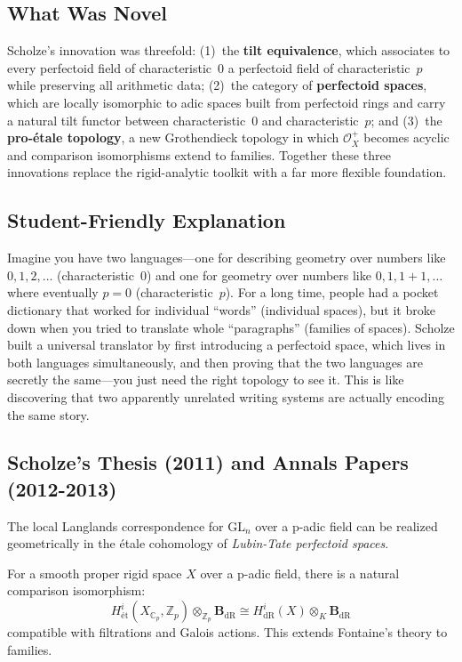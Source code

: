 \subsection{What Was Novel}
Scholze's innovation was threefold: (1)~the \textbf{tilt equivalence}, which associates to every perfectoid field of characteristic~$0$ a perfectoid field of characteristic~$p$ while preserving all arithmetic data; (2)~the category of \textbf{perfectoid spaces}, which are locally isomorphic to adic spaces built from perfectoid rings and carry a natural tilt functor between characteristic~$0$ and characteristic~$p$; and (3)~the \textbf{pro-étale topology}, a new Grothendieck topology in which $\mathcal{O}_X^+$ becomes acyclic and comparison isomorphisms extend to families. Together these three innovations replace the rigid-analytic toolkit with a far more flexible foundation.

\subsection{Student-Friendly Explanation}
Imagine you have two languages---one for describing geometry over numbers like $0, 1, 2, \ldots$ (characteristic~$0$) and one for geometry over numbers like $0, 1, 1+1, \ldots$ where eventually $p=0$ (characteristic~$p$). For a long time, people had a pocket dictionary that worked for individual ``words'' (individual spaces), but it broke down when you tried to translate whole ``paragraphs'' (families of spaces). Scholze built a universal translator by first introducing a perfectoid space, which lives in both languages simultaneously, and then proving that the two languages are secretly the same---you just need the right topology to see it. This is like discovering that two apparently unrelated writing systems are actually encoding the same story.

\subsection{Scholze's Thesis (2011) and Annals Papers (2012-2013)}

\begin{theorem}
The local Langlands correspondence for $\text{GL}_n$ over a p-adic field can be realized geometrically in the \'etale cohomology of \emph{Lubin-Tate perfectoid spaces}.
\end{theorem}

\begin{theorem}
For a smooth proper rigid space $X$ over a p-adic field, there is a natural comparison isomorphism:
\[
H^i_{\text{\'et}}(X_{\mathbb{C}_p}, \mathbb{Z}_p) \otimes_{\mathbb{Z}_p} \mathbf{B}_{\text{dR}} \cong H^i_{\text{dR}}(X) \otimes_K \mathbf{B}_{\text{dR}}
\]
compatible with filtrations and Galois actions. This extends Fontaine's theory to families.
\end{theorem}

